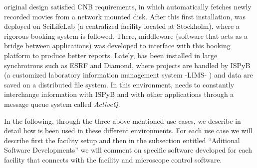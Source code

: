 \scipion original design satisfied CNB requirements, in which \scipion automatically fetches newly recorded movies from a network mounted disk. After this first installation, \scipion was deployed on SciLifeLab (a centralized facility located at Stockholm), where a rigorous booking system is followed. There, middleware (software that acts as a bridge between applications) was developed to interface with this booking platform to produce better reports. Lately,  \scipion has been installed in  large synchrotrons  such as ESRF and Diamond,  where projects are handled by ISPyB (a customized laboratory information management system -LIMS- \citep{Delageniere2011:ispb}) and data are saved on a distributed file system. %
In this environment, \scipion needs to constantly interchange information with ISPyB and with other applications through a message queue system called \emph{ActiveQ}.%


In the following, through the three above mentioned use cases, we describe in detail how \scipion is been used in these different environments. %
For each use case we will describe first the facility setup and then in the subsection entitled ``Aditional Software Developments'' we will comment on specific  software developed for each facility that connects \scipion with the facility and microscope control software.









